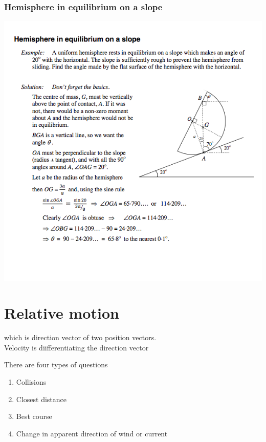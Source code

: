 \documentclass[a4paper]{article}
\begin{document}
\subsubsection{Hemisphere in equilibrium on a slope}
\begin{center}
    \includegraphics[scale=0.5]{img_M/14_eg4}
\end{center}

\section{Relative motion}
\begin{defi}
    which is direction vector of two position vectors.\\
    Velocity is diifferentiating the direction vector
\end{defi}

There are four types of questions
\begin{enumerate}
\item Collisions
\item Closest distance
\item Best course
\item Change in apparent direction of wind or current
\end{enumerate}
\end{document}
